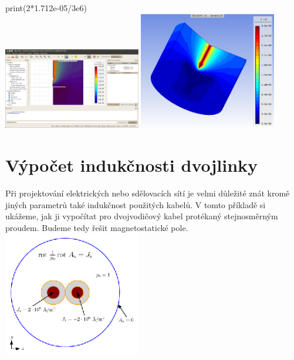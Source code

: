 \documentclass[a4paper, oneside]{article}
\begin{document}
print(2*1.712e-05/3e6)\\
\includegraphics[width=6cm]{Vypocet_kapacity.eps}
\includegraphics[width=6cm]{Potencial.eps}\\
\section{Výpočet indukčnosti dvojlinky}
Při projektování elektrických nebo sdělovacích sítí je velmi důležité znát kromě jiných parametrů také indukčnost použitých kabelů. V tomto příkladě si ukážeme, jak ji vypočítat pro dvojvodičový kabel protékaný stejnosměrným proudem. Budeme tedy řešit magnetostatické pole.\\
\includegraphics[width=6cm]{Matematicky_model_dvojlinky.eps}\\
\end{document}
